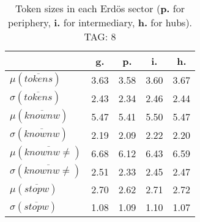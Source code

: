 \begin{table}[h!]
\begin{center}
\begin{tabular}{| l || c | c | c | c |}\hline
 & {\bf g.} & {\bf p.} & {\bf i.} & {\bf h.} \\\hline\hline
$\mu(\overline{tokens})$ & 3.63  & 3.58  & 3.60  & 3.67 \\
$\sigma(\overline{tokens})$ & 2.43  & 2.34  & 2.46  & 2.44 \\\hline
$\mu(\overline{knownw})$ & 5.47  & 5.41  & 5.50  & 5.47 \\
$\sigma(\overline{knownw})$ & 2.19  & 2.09  & 2.22  & 2.20 \\\hline
$\mu(\overline{knownw \neq})$ & 6.68  & 6.12  & 6.43  & 6.59 \\
$\sigma(\overline{knownw \neq})$ & 2.51  & 2.33  & 2.45  & 2.47 \\\hline
$\mu(\overline{stopw})$ & 2.70  & 2.62  & 2.71  & 2.72 \\
$\sigma(\overline{stopw})$ & 1.08  & 1.09  & 1.10  & 1.07 \\\hline
\end{tabular}
\caption{Token sizes in each Erd\"os sector ({{\bf p.}} for periphery, {{\bf i.}} for intermediary, {{\bf h.}} for hubs). TAG: 8}
\end{center}
\end{table}